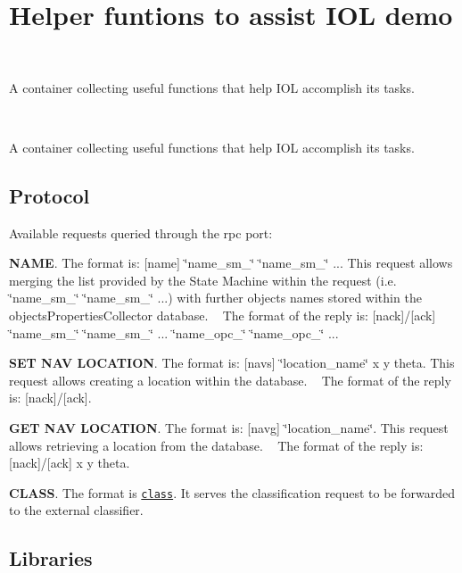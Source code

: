 \section{Helper funtions to assist I\+OL demo}
\label{group__icub__iolHelper}


~\newline


A container collecting useful functions that help I\+OL accomplish its tasks.  


~\newline


A container collecting useful functions that help I\+OL accomplish its tasks. 

\hypertarget{group__icub__iolHelper_proto_sec}{}\subsection{Protocol}\label{group__icub__iolHelper_proto_sec}
Available requests queried through the rpc port\+:
\begin{DoxyEnumerate}
\item {\bfseries N\+A\+ME}. The format is\+: \mbox{[}name\mbox{]} \char`\"{}name\+\_\+sm\+\_\char`\"{} \char`\"{}name\+\_\+sm\+\_\char`\"{} ... This request allows merging the list provided by the State Machine within the request (i.\+e. \char`\"{}name\+\_\+sm\+\_\char`\"{} \char`\"{}name\+\_\+sm\+\_\char`\"{} ...) with further objects names stored within the objects\+Properties\+Collector database. ~\newline
 The format of the reply is\+: \mbox{[}nack\mbox{]}/\mbox{[}ack\mbox{]} \char`\"{}name\+\_\+sm\+\_\char`\"{} \char`\"{}name\+\_\+sm\+\_\char`\"{} ... \char`\"{}name\+\_\+opc\+\_\char`\"{} \char`\"{}name\+\_\+opc\+\_\char`\"{} ...
\item {\bfseries S\+ET N\+AV L\+O\+C\+A\+T\+I\+ON}. The format is\+: \mbox{[}navs\mbox{]} \char`\"{}location\+\_\+name\char`\"{} x y theta. This request allows creating a location within the database. ~\newline
 The format of the reply is\+: \mbox{[}nack\mbox{]}/\mbox{[}ack\mbox{]}.
\item {\bfseries G\+ET N\+AV L\+O\+C\+A\+T\+I\+ON}. The format is\+: \mbox{[}navg\mbox{]} \char`\"{}location\+\_\+name\char`\"{}. This request allows retrieving a location from the database. ~\newline
 The format of the reply is\+: \mbox{[}nack\mbox{]}/\mbox{[}ack\mbox{]} x y theta.
\item {\bfseries C\+L\+A\+SS}. The format is \href{(blob_0 (tlx tly brx 
   bry)) (blob_1 (tlx tly brx bry)) ...}{\tt class}. It serves the classification request to be forwarded to the external classifier.
\end{DoxyEnumerate}\hypertarget{group__icub__iolStateMachineHandler_lib_sec}{}\subsection{Libraries}\label{group__icub__iolStateMachineHandler_lib_sec}


